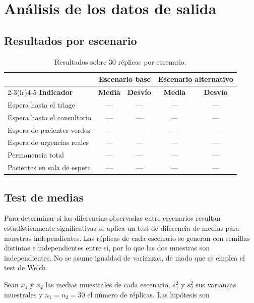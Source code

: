 \documentclass{article}
\begin{document}
\section{Análisis de los datos de salida}

\subsection{Resultados por escenario}

\begin{table}[H]
\centering
\small
\begin{tabular}{lcccc}
\toprule
 & \multicolumn{2}{c}{\textbf{Escenario base}} & \multicolumn{2}{c}{\textbf{Escenario alternativo}} \\
\cmidrule(lr){2-3}\cmidrule(lr){4-5}
\textbf{Indicador} & \textbf{Media} & \textbf{Desvío} & \textbf{Media} & \textbf{Desvío} \\
\midrule
Espera hasta el triage      & --- & --- & --- & --- \\
Espera hasta el consultorio & --- & --- & --- & --- \\
Espera de pacientes verdes  & --- & --- & --- & --- \\
Espera de urgencias reales  & --- & --- & --- & --- \\
Permanencia total           & --- & --- & --- & --- \\
Pacientes en sala de espera & --- & --- & --- & --- \\
\bottomrule
\end{tabular}
\caption{Resultados sobre 30 réplicas por escenario.}
\label{tab:resultados}
\end{table}

\subsection{Test de medias}

Para determinar si las diferencias observadas entre escenarios resultan
estadísticamente significativas se aplica un test de diferencia de medias
para muestras independientes. Las réplicas de cada escenario se generan con
semillas distintas e independientes entre sí, por lo que las dos muestras son
independientes. No se asume igualdad de varianzas, de modo que se emplea el
test de Welch.

Sean $\bar{x}_1$ y $\bar{x}_2$ las medias muestrales de cada escenario,
$s_1^2$ y $s_2^2$ sus varianzas muestrales y $n_1 = n_2 = 30$ el número de
réplicas. Las hipótesis son
\end{document}
